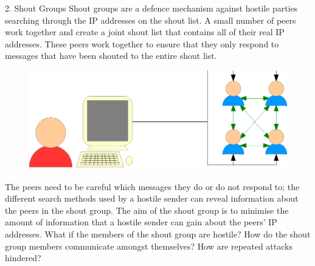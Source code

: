 \documentclass[ %
                    author={Luke Murray},
                supervisor={Dr. Simon Hollis},
                     title={Shadow Peer-to-Peer Networks},
                  subtitle={},
                    degree={MEng},
                      year={2013} ]{poster}
\begin{document}
\begin{frame}{}
\begin{columns}[t]
    \begin{column}{0.422\linewidth}
    \begin{block}{\normalsize 2. Shout Groups}
    \small Shout groups are a defence mechanism against hostile parties searching through the IP addresses on the shout list. A small number of peers work together and create a joint shout list that contains all of their real IP addresses. These peers work together to ensure that they only respond to messages that have been shouted to the entire shout list.
    \begin{figure}[h]
        \includegraphics{poster_d3.eps}
    \end{figure}
    The peers need to be careful which messages they do or do not respond to; the different search methods used by a hostile sender can reveal information about the peers in the shout group. The aim of the shout group is to minimise the amount of information that a hostile sender can gain about the peers' IP addresses. What if the members of the shout group are hostile? How do the shout group members communicate amongst themselves? How are repeated attacks hindered?
    \end{block}
    \end{column}
\end{columns}

\vfill


\end{frame}
\end{document}

